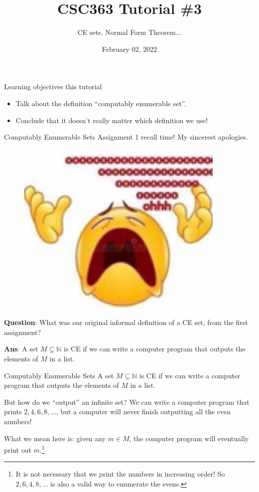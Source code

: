 \documentclass{beamer}
\title{CSC363 Tutorial \#3}
\subtitle{CE sets, Normal Form Theorem...}
\date{February 02, 2022}
\institute{}
\newcommand{\N}{\mathbb N}
\begin{document}
\maketitle

\begin{frame}{Learning objectives this tutorial}
\begin{itemize}
\item Talk about the definition ``computably enumerable set''.
\item Conclude that it doesn't really matter which definition we use!
\end{itemize}
\end{frame}

\begin{frame}{Computably Enumerable Sets}
Assignment 1 recall time! My sincerest apologies.

\begin{figure}
    \centering
    \includegraphics[scale=0.3]{img/oh.png}
\end{figure}


\textbf{Question}: What was our original informal definition of a CE set, from the first assignment? 

\pause

\textbf{Ans}: A set $M \subseteq \N$ is CE if we can write a computer program that outputs the elements of $M$ in a list.
\end{frame}

\begin{frame}{Computably Enumerable Sets}
A set $M \subseteq \N$ is CE if we can write a computer program that outputs the elements of $M$ in a list.

But how do we ``output'' an infinite set? We can write a computer program that prints $2, 4, 6, 8, \ldots$, but a computer will never finish outputting all the even numbers!

\pause

What we mean here is: given any $m \in M$, the computer program will eventually print out $m$.\footnote{It is not necessary that we print the numbers in increasing order! So $2, 6, 4, 8, \ldots$ is also a valid way to enumerate the evens.}
\end{frame}
\end{document}
